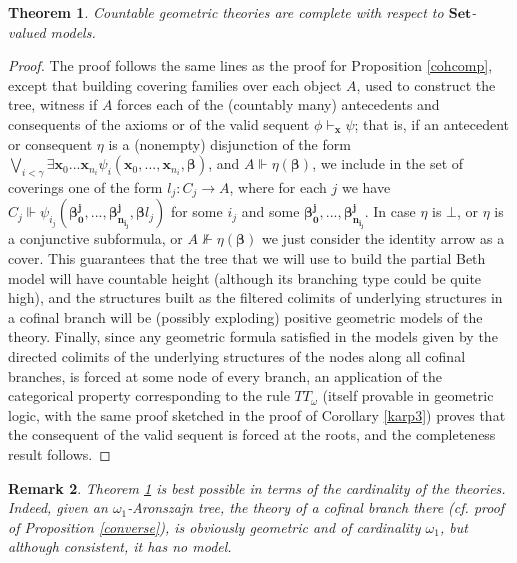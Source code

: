 \documentclass[a4paper,11pt]{article}
\theoremstyle{plain}
\newtheorem{thm}{Theorem}[subsection]
\newtheorem{rmk}[thm]{Remark}
\theoremstyle{plain}
\theoremstyle{remark}
\newcommand{\Sets}{\ensuremath{\mathbf{Set}}}
\begin{document}
\begin{thm}\label{fg}
Countable geometric theories are complete with respect to \Sets-valued models. 
\end{thm}

\begin{proof}
The proof follows the same lines as the proof for Proposition \ref{cohcomp}, except that building covering families over each object $A$, used to construct the tree, witness if $A$ forces each of the (countably many) antecedents and consequents of the axioms or of the valid sequent $\phi \vdash_{\mathbf{x}} \psi$; that is, if an antecedent or consequent $\eta$ is a (nonempty) disjunction of the form $\bigvee_{i<\gamma}\exists \mathbf{x}_{0}...\mathbf{x}_{n_i} \psi_i(\mathbf{x}_0, ...,\mathbf{x}_{n_i}, \boldsymbol{\beta})$, and $A \Vdash \eta(\boldsymbol{\beta})$, we include in the set of coverings one of the form $l_j: C_j \to A$, where for each $j$ we have $C_j \Vdash \psi_{i_j}(\boldsymbol{\beta_0^j}, ..., \boldsymbol{\beta_{n_{i_j}}^j}, \boldsymbol{\beta} l_j)$ for some $i_j$ and some $\boldsymbol{\beta_0^j}, ..., \boldsymbol{\beta_{n_{i_j}}^j}$. In case $\eta$ is $\bot$, or $\eta$ is a conjunctive subformula, or $A \nVdash \eta(\boldsymbol{\beta})$ we just consider the identity arrow as a cover. This guarantees that the tree that we will use to build the partial Beth model will have countable height (although its branching type could be quite high), and the structures built as the filtered colimits of underlying structures in a cofinal branch will be (possibly exploding) positive geometric models of the theory. Finally, since any geometric formula satisfied in the models given by the directed colimits of the underlying structures of the nodes along all cofinal branches, is forced at some node of every branch, an application of the categorical property corresponding to the rule $TT_{\omega}$ (itself provable in geometric logic, with the same proof sketched in the proof of Corollary \ref{karp3}) proves that the consequent of the valid sequent is forced at the roots, and the completeness result follows.
\end{proof}

\begin{rmk}
Theorem \ref{fg} is best possible in terms of the cardinality of the theories. Indeed, given an $\omega_1$-Aronszajn tree, the theory of a cofinal branch there (\emph{cf.} proof of Proposition \ref{converse}), is obviously geometric and of cardinality $\omega_1$, but although consistent, it has no model.
\end{rmk}
\end{document}
